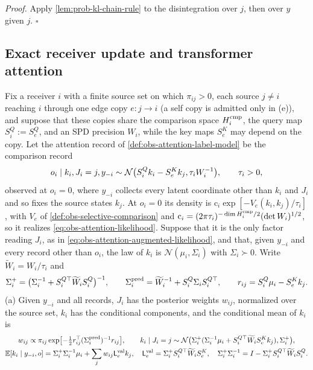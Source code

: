 \noindent\emph{Proof.}
Apply \cref{lem:prob-kl-chain-rule} to the disintegration over \(j\), then over
\(y\) given \(j\). \(\square\)

\subsection{Exact receiver update and transformer attention}
\label{sec:selective-transformer}

Fix a receiver \(i\) with a finite source set on which \(\pi_{ij}>0\), each
source \(j\ne i\) reaching \(i\) through one edge copy \(e:j\to i\) (a self
copy is admitted only in (e)), and suppose
that these copies share the comparison space \(H_i^{\rm cmp}\), the query map
\(S^Q_i:=S^Q_e\), and an SPD precision \(W_i\), while the key maps \(S^K_e\) may
depend on the copy. Let the attention record of
\cref{def:obs-attention-label-model} be the comparison record
\begin{equation}
o_i\mid k_i,J_i=j,y_{-i}\sim
\mathcal N\bigl(S^Q_ik_i-S^K_ek_j,\tau_iW_i^{-1}\bigr),
\qquad\tau_i>0,
\label{eq:obs-selective-attention-record}
\end{equation}
observed at \(o_i=0\), where \(y_{-i}\) collects every latent coordinate other
than \(k_i\) and \(J_i\) and so fixes the source states \(k_j\). At \(o_i=0\)
its density is \(\mathrm c_i\exp[-V_e(k_i,k_j)/\tau_i]\), with \(V_e\) of
\cref{def:obs-selective-comparison} and
\(\mathrm c_i=(2\pi\tau_i)^{-\dim H_i^{\rm cmp}/2}(\det W_i)^{1/2}\), so it
realizes \eqref{eq:obs-attention-likelihood}. Suppose that it is the only
factor reading \(J_i\), as in \eqref{eq:obs-attention-augmented-likelihood},
and that, given \(y_{-i}\) and every record other than \(o_i\), the law of
\(k_i\) is \(\mathcal N(\mu_i,\Sigma_i)\) with \(\Sigma_i\succ0\). Write
\(\widetilde W_i=W_i/\tau_i\) and
\begin{equation}
\Sigma_i^+=\bigl(\Sigma_i^{-1}+S_i^{Q\top}\widetilde W_iS^Q_i\bigr)^{-1},
\qquad
\Sigma_i^{\rm pred}=\widetilde W_i^{-1}+S^Q_i\Sigma_iS_i^{Q\top},
\qquad
r_{ij}=S^Q_i\mu_i-S^K_ek_j.
\label{eq:obs-selective-receiver-covariances}
\end{equation}
(a) Given \(y_{-i}\) and all records, \(J_i\) has the posterior weights
\(w_{ij}\), normalized over the source set, \(k_i\) has the conditional
components, and the conditional mean of \(k_i\) is
\begin{gather}
w_{ij}\propto\pi_{ij}\exp\bigl[-\tfrac12r_{ij}^\top(\Sigma_i^{\rm pred})^{-1}r_{ij}\bigr],
\qquad
k_i\mid J_i=j\sim\mathcal N\bigl(\Sigma_i^+(\Sigma_i^{-1}\mu_i
+S_i^{Q\top}\widetilde W_iS^K_ek_j),\Sigma_i^+\bigr),
\label{eq:obs-selective-receiver-posterior}\\
\mathbb E[k_i\mid y_{-i},o]=\Sigma_i^+\Sigma_i^{-1}\mu_i+\sum_jw_{ij}\mathsf L_e^{\rm val}k_j,
\quad
\mathsf L_e^{\rm val}=\Sigma_i^+S_i^{Q\top}\widetilde W_iS^K_e,
\quad
\Sigma_i^+\Sigma_i^{-1}=I-\Sigma_i^+S_i^{Q\top}\widetilde W_iS^Q_i.
\label{eq:obs-selective-receiver-update}
\end{gather}
